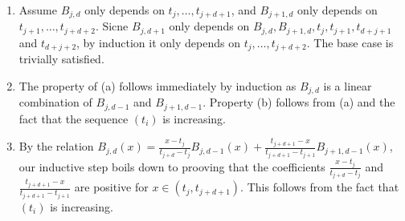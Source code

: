 \documentclass{article}
\begin{document}
\begin{enumerate}
\item 
    Assume $B_{j,d}$ only depends on $t_j,\ldots, t_{j + d + 1}$,
    and $B_{j + 1,d}$ only depends on $t_{j + 1},\ldots, t_{j + d + 2}$.
    Sicne $B_{j,d + 1}$ only depends on $B_{j,d},B_{j + 1, d}, t_j, t_{j + 1}, t_{d + j + 1}$
    and $t_{d + j + 2}$,
    by induction it only depends on $t_j,\ldots, t_{j + d + 2}$.
    The base case is trivially satisfied.

\item
    The property of (a) follows immediately by induction as $B_{j,d}$
    is a linear combination of $B_{j,d - 1}$ and $B_{j + 1, d - 1}$.
    Property (b) follows from (a) and the fact that the sequence $(t_i)$ is increasing.

\item
    By the relation 
    $B_{j,d}(x)
    = \frac {x - t_j}{t_{j + d} - t_j} B_{j,d - 1}(x)
    + \frac {t_{j + d + 1} - x}{t_{j + d + 1} - t_{j + 1}} B_{j + 1, d - 1}(x)$,
    our inductive step boils down to prooving that the coefficients
    $\frac {x - t_j}{t_{j + d} - t_j}$ and
    $\frac {t_{j + d + 1} - x}{t_{j + d + 1} - t_{j + 1}}$
    are positive for $x\in(t_j, t_{j + d + 1})$.
    This follows from the fact that $(t_i)$ is increasing.

\end{enumerate}
\end{document}
